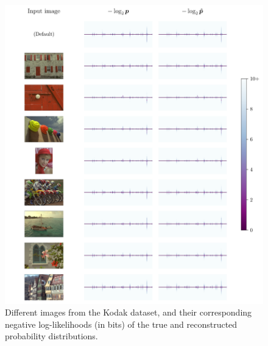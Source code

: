 \begin{figure}[htbp]
  \centering
  \includegraphics[width=\linewidth]{img/pdf_compression/pdfs1.pdf}
  \caption[Visualization of target and reconstructed probability distributions]{%
    Different images from the Kodak dataset, and their corresponding negative log-likelihoods (in bits) of the true and reconstructed probability distributions.%
  }
  \label{fig:pdf/pdfs}
\end{figure}

